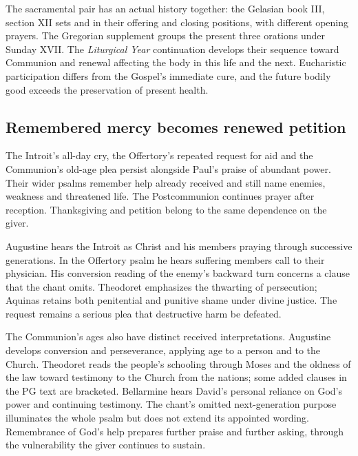 The sacramental pair has an actual history together: the Gelasian book III, section XII sets  and  in their offering and closing positions, with different opening prayers. The Gregorian supplement groups the present three orations under Sunday XVII. The \textit{Liturgical Year} continuation develops their sequence toward Communion and renewal affecting the body in this life and the next. Eucharistic participation differs from the Gospel's immediate cure, and the future bodily good exceeds the preservation of present health. 

\subsection*{Remembered mercy becomes renewed petition}
The Introit's all-day cry, the Offertory's repeated request for aid and the Communion's old-age plea persist alongside Paul's praise of abundant power. Their wider psalms remember help already received and still name enemies, weakness and threatened life. The Postcommunion continues prayer after reception. Thanksgiving and petition belong to the same dependence on the giver.

Augustine hears the Introit as Christ and his members praying through successive generations. In the Offertory psalm he hears suffering members call to their physician. His conversion reading of the enemy's backward turn concerns a clause that the chant omits. Theodoret emphasizes the thwarting of persecution; Aquinas retains both penitential and punitive shame under divine justice. The request remains a serious plea that destructive harm be defeated. 

The Communion's ages also have distinct received interpretations. Augustine develops conversion and perseverance, applying age to a person and to the Church. Theodoret reads the people's schooling through Moses and the oldness of the law toward testimony to the Church from the nations; some added clauses in the PG text are bracketed. Bellarmine hears David's personal reliance on God's power and continuing testimony. The chant's omitted next-generation purpose illuminates the whole psalm but does not extend its appointed wording. Remembrance of God's help prepares further praise and further asking, through the vulnerability the giver continues to sustain. 
